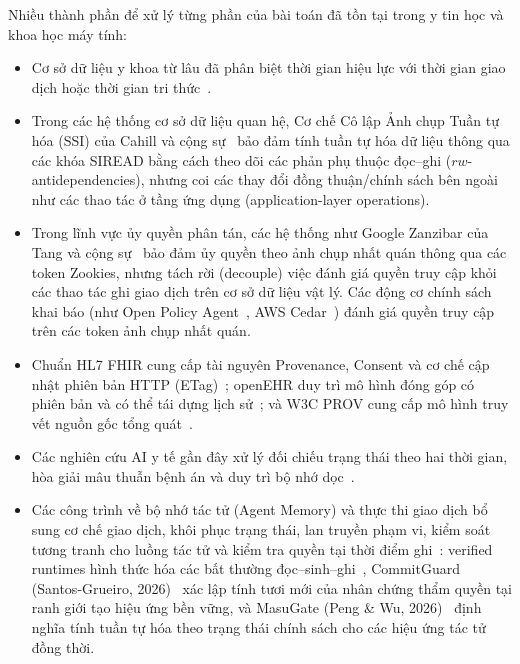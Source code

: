\documentclass[11pt]{article}
\begin{document}
Nhiều thành phần để xử lý từng phần của bài toán đã tồn tại trong y tin học và khoa học máy tính:
\begin{itemize}
    \item Cơ sở dữ liệu y khoa từ lâu đã phân biệt thời gian hiệu lực với thời gian giao dịch hoặc thời gian tri thức~\cite{gabrieli1992,kouramajian1994,kumar1998}.
    \item Trong các hệ thống cơ sở dữ liệu quan hệ, Cơ chế Cô lập Ảnh chụp Tuần tự hóa (SSI) của Cahill và cộng sự~\cite{cahill2008,cahill2009} bảo đảm tính tuần tự hóa dữ liệu thông qua các khóa SIREAD bằng cách theo dõi các phản phụ thuộc đọc--ghi ($rw$-antidependencies), nhưng coi các thay đổi đồng thuận/chính sách bên ngoài như các thao tác ở tầng ứng dụng (application-layer operations).
    \item Trong lĩnh vực ủy quyền phân tán, các hệ thống như Google Zanzibar của Tang và cộng sự~\cite{zanzibar2019} bảo đảm ủy quyền theo ảnh chụp nhất quán thông qua các token Zookies, nhưng tách rời (decouple) việc đánh giá quyền truy cập khỏi các thao tác ghi giao dịch trên cơ sở dữ liệu vật lý. Các động cơ chính sách khai báo (như Open Policy Agent~\cite{opa}, AWS Cedar~\cite{cedar}) đánh giá quyền truy cập trên các token ảnh chụp nhất quán.
    \item Chuẩn HL7 FHIR cung cấp tài nguyên Provenance, Consent và cơ chế cập nhật phiên bản HTTP (ETag)~\cite{fhirprov,fhirconsent,fhirhttp}; openEHR duy trì mô hình đóng góp có phiên bản và có thể tái dựng lịch sử~\cite{openehr}; và W3C PROV cung cấp mô hình truy vết nguồn gốc tổng quát~\cite{prov}.
    \item Các nghiên cứu AI y tế gần đây xử lý đối chiếu trạng thái theo hai thời gian, hòa giải mâu thuẫn bệnh án và duy trì bộ nhớ dọc~\cite{zhao2026,vitaltrace,dualstream,vista,healthclaw}.
    \item Các công trình về bộ nhớ tác tử (Agent Memory) và thực thi giao dịch bổ sung cơ chế giao dịch, khôi phục trạng thái, lan truyền phạm vi, kiểm soát tương tranh cho luồng tác tử và kiểm tra quyền tại thời điểm ghi~\cite{doyle,memtx,memtxn,memclaw,toki,cordon,agentictransaction2026,atcc2026}: verified runtimes hình thức hóa các bất thường đọc--sinh--ghi~\cite{verifiedconcurrency}, CommitGuard (Santos-Grueiro, 2026)~\cite{temporaryauth} xác lập tính tươi mới của nhân chứng thẩm quyền tại ranh giới tạo hiệu ứng bền vững, và MasuGate (Peng \& Wu, 2026)~\cite{statefulgov} định nghĩa tính tuần tự hóa theo trạng thái chính sách cho các hiệu ứng tác tử đồng thời.
\end{itemize}
\end{document}
